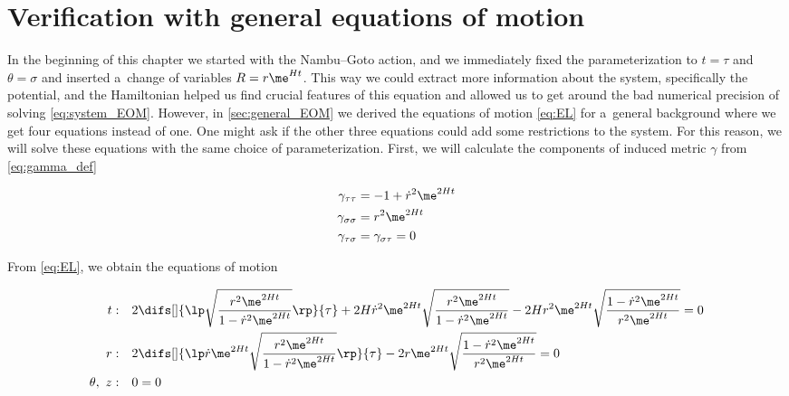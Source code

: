 \clearpage

\section{Verification with general equations of motion}
\label{sec:desiter_general}

In the beginning of this chapter we started with the Nambu--Goto action, and we immediately fixed the parameterization to $t = \tau$ and $\theta = \sigma$ and inserted a~change of variables $R = r \me^{Ht}$. This way we could extract more information about the system, specifically the potential, and the Hamiltonian helped us find crucial features of this equation and allowed us to get around the bad numerical precision of solving \cref{eq:system_EOM}. However, in \ref{sec:general_EOM} we derived the equations of motion \eqref{eq:EL} for a~general background where we get four equations instead of one. One might ask if the other three equations could add some restrictions to the system. For this reason, we will solve these equations with the same choice of parameterization. First, we will calculate the components of induced metric $\gamma$ from \cref{eq:gamma_def}

\begin{equation}
    \begin{aligned}
            \gamma_{\tau \tau} & = -1 + \dot{r}^2 \me^{2Ht} \\
            \gamma_{\sigma \sigma} & = r^2 \me^{2Ht} \\
            \gamma_{\tau \sigma} & = \gamma_{\sigma \tau} = 0
    \end{aligned}
\end{equation}

\noindent
From \eqref{eq:EL}, we obtain the equations of motion

\begin{align}
    \label{eq:desiter_EOM_t}  t: & \quad 2 \difs[]{\lp \sqrt{\frac{r^2 \me^{2Ht}}{1-\dot{r}^2 \me^{2Ht}}} \rp}{\tau} 
    + 2H \dot{r}^2 \me^{2Ht} \sqrt{\frac{r^2 \me^{2Ht}}{1-\dot{r}^2 \me^{2Ht}}} 
    - 2H r^2 \me^{2Ht} \sqrt{\frac{1-\dot{r}^2 \me^{2Ht}}{r^2 \me^{2Ht}}} = 0 \\
    \label{eq:desiter_EOM_r}    r: & \quad 2 \difs[]{\lp \dot{r} \me^{2Ht} \sqrt{\frac{r^2 \me^{2Ht}}{1-\dot{r}^2 \me^{2Ht}}} \rp}{\tau}
    - 2 r \me^{2Ht} \sqrt{\frac{1-\dot{r}^2 \me^{2Ht}}{r^2 \me^{2Ht}}} = 0 \\
    \theta, ~ z: & \quad 0 = 0
\end{align}

